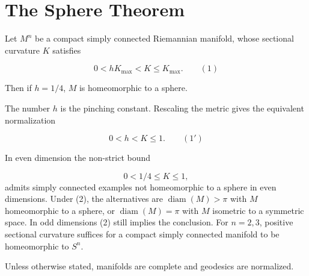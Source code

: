 \chapter{The Sphere Theorem}
\label{chap:dc-sphere-theorem}

\begin{theorem}
  \label{thm:dc-ch13-1-1}
  Let $M^n$ be a compact simply connected Riemannian manifold, whose sectional
  curvature $K$ satisfies

  $$
  0<hK_{\max}<K\leq K_{\max}.\qquad(1)
  $$

  Then if $h=1/4$, $M$ is homeomorphic to a sphere.

  The number $h$ is the pinching constant. Rescaling the metric gives the equivalent
  normalization

  $$
  0<h<K\leq 1.\qquad(1')
  $$

  In even dimension the non-strict bound

  $$
  0<1/4\leq K\leq1,\tag{2}
  $$
  admits simply connected examples not homeomorphic to a sphere in even dimensions.
  Under (2), the alternatives are $\operatorname{diam}(M)>\pi$ with $M$ homeomorphic
  to a sphere, or $\operatorname{diam}(M)=\pi$ with $M$ isometric to a symmetric
  space. In odd dimensions (2) still implies the conclusion. For $n=2,3$, positive
  sectional curvature suffices for a compact simply connected manifold to be
  homeomorphic to $S^n$.

  Unless otherwise stated, manifolds are complete and geodesics are normalized.
\end{theorem}
